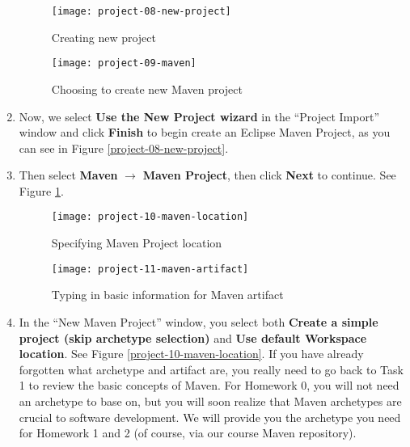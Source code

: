 \begin{enumerate}

\begin{figure}[t]
\hspace{-2em}
\begin{minipage}{0.5\textwidth}
\texttt{[image: project-08-new-project]}
\caption{Creating new project\label{project-08-new-project}}
\end{minipage}
\hfill
\begin{minipage}{0.5\textwidth}
\centering
\texttt{[image: project-09-maven]}
\caption{Choosing to create new Maven project\label{project-09-maven}}
\end{minipage}
\hspace{-2em}
\end{figure}

\item Now, we select \textbf{Use the New Project wizard} in the ``Project
Import'' window and click \textbf{Finish} to begin create an Eclipse Maven
Project, as you can see in Figure \ref{project-08-new-project}.

\item Then select \textbf{Maven} $\rightarrow$ \textbf{Maven Project}, then
click \textbf{Next} to continue. See Figure \ref{project-09-maven}.

\begin{figure}[t]
\hspace{-3em}
\begin{minipage}{0.5\textwidth}
\centering
\texttt{[image: project-10-maven-location]}
\caption{Specifying Maven Project location\label{project-10-maven-location}}
\end{minipage}
\hfill
\begin{minipage}{0.5\textwidth}
\centering
\texttt{[image: project-11-maven-artifact]}
\caption{Typing in basic information for Maven artifact\label{project-11-maven-artifact}}
\end{minipage}
\hspace{-3em}
\end{figure}

\item In the ``New Maven Project'' window, you select both \textbf{Create a
simple project (skip archetype selection)} and \textbf{Use default Workspace
location}. See Figure \ref{project-10-maven-location}. If you have already
forgotten what archetype and artifact are, you really need to go back to Task 1
to review the basic concepts of Maven. For Homework 0, you will not need an
archetype to base on, but you will soon realize that Maven archetypes are
crucial to software development. We will provide you the archetype you need for
Homework 1 and 2 (of course, via our course Maven repository).


\end{enumerate}
